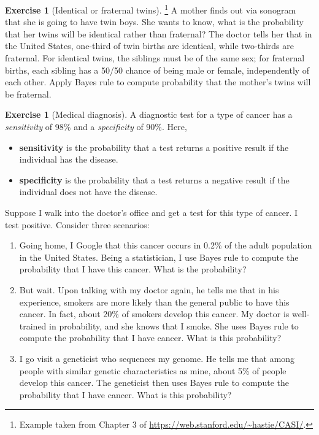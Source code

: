 \documentclass[11pt]{article}
\theoremstyle{definition}
\newtheorem{exercise}[]{Exercise}
\begin{document}
\begin{exercise}[Identical or fraternal twins]\footnote{
  Example taken from Chapter 3 of \url{https://web.stanford.edu/~hastie/CASI/}.
  }
  A mother finds out via sonogram that she is going to have twin boys.
  She wants to know, what is the probability that her twins will be
  identical rather than fraternal? The doctor tells her that in the United States, one-third of twin births
  are identical, while two-thirds are fraternal.
  For identical twins, the siblings must be of the same sex; for fraternal births,
  each sibling has a 50/50 chance of being male or female,
  independently of each other.
  Apply Bayes rule to compute probability that the mother's twins will be fraternal.
\end{exercise}

\begin{exercise}[Medical diagnosis]
  A diagnostic test for a type of cancer has a \textit{sensitivity} of 98\% and a
  \textit{specificity} of 90\%. Here,
  \begin{itemize}
    \item \textbf{sensitivity} is the probability that a test returns a positive result if the
individual has the disease.
    \item \textbf{specificity} is the probability that a test returns a negative result if the
individual does not have the disease.
  \end{itemize}

  Suppose I walk into the doctor's office and get a test for this type of cancer.
  I test positive. Consider three scenarios:
  \begin{enumerate}[label = (\alph*)]
    \item Going home, I Google that this cancer occurs in 0.2\% of the
    adult population in the United States.
    Being a statistician, I use Bayes rule to compute the probability that I have
    this cancer. What is the probability?
    \item But wait. Upon talking with my doctor again, he tells me that in his experience,
    smokers are more likely than the general public to have this cancer.
    In fact, about 20\% of smokers develop this cancer. My doctor is well-trained in
    probability, and she knows that I smoke.
    She uses Bayes rule to compute the probability that I have cancer. What is
    this probability?
    \item I go visit a geneticist who sequences my genome.
    He tells me that among people with similar genetic characteristics as mine,
    about 5\% of people develop this cancer.
    The geneticist then uses Bayes rule to compute the probability that
    I have cancer. What is this probability?
  \end{enumerate}
  \label{ex:diagnostic}
\end{exercise}
\end{document}
